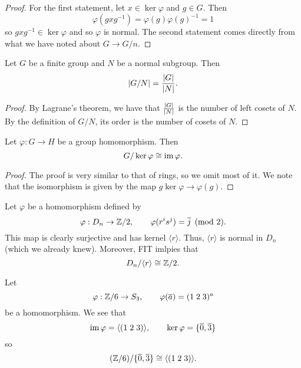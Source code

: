 \begin{proof}
    For the first statement, let $x \in \ker\varphi$ and $g \in G$.
    Then
    \[
        \varphi(gxg^{-1}) = \varphi(g)\varphi(g)^{-1} = 1
    \]
    so $gxg^{-1} \in \ker\varphi$ and so $\varphi$ is normal.
    The second statement comes directly from what we have noted about 
    $G \to G/n$.
\end{proof}

\begin{lemma}[]
    Let $G$ be a finite group and $N$ be a normal subgroup.
    Then
    \[
        \left\lvert G/N\right\rvert = \frac{\left\lvert G\right\rvert}{\left\lvert N\right\rvert}. 
    \]
\end{lemma}

\begin{proof}
    By Lagrane's theorem, we have that $\frac{\left\lvert G\right\rvert}{\left\lvert N\right\rvert}$ is the number of left
    cosets of $N$.
    By the definition of $G/N$, its order is the number of cosets of $N$.
\end{proof}

\begin{theorem}
    Let $\varphi:G \to H$ be a group homomorphism.
    Then
    \[
        G/\ker\varphi \cong \operatorname{im}\varphi.
    \]
\end{theorem}

\begin{proof}
    The proof is very similar to that of rings, so we omit most of it.
    We note that the isomorphism is given by the map $g\ker\varphi \to \varphi(g)$.
\end{proof}

\begin{example}
    Let $\varphi$ be a homomorphism defined by
    \[
        \varphi: D_n \to \mathbb{Z}/2, \qquad \varphi(r^is^j) = \overline j \pmod 2.
    \]
    This map is clearly surjective and has kernel $\langle r \rangle$.
    Thus, $\langle r \rangle$ is normal in $D_n$
    (which we already knew).
    Moreover, FIT imlpies that
    \[
        D_n/\langle r \rangle \cong \mathbb{Z}/2.
    \]
\end{example}

\begin{example}
    Let
    \[
        \varphi: \mathbb{Z}/6 \to S_3, \qquad \varphi(\overline a) = (1\;2\;3)^a
    \]
    be a homomorphism.
    We see that
    \[
        \operatorname{im}\varphi = \langle(1\;2\;3)\rangle, \qquad \ker\varphi = \{\overline0, \overline3\}
    \]
    so
    \[
        (\mathbb{Z}/6)/\{\overline 0, \overline 3\} \cong \langle (1\;2\;3) \rangle.
    \]
\end{example}
